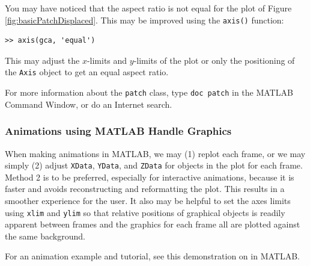 You may have noticed that the aspect ratio is not equal for the plot of Figure \ref{fig:basicPatchDisplaced}. This may be improved using the \texttt{axis()} function:
\begin{lstlisting}[style=Matlab-editor,label=basicPatchDisplace,caption={A Command Window modification to the \texttt{patch} defined in Listing \ref{basicPatch}. Line 1 is used to specify the $x$- and $y$-components of the displacement. The displacement is then applied to the original \texttt{XData} and \texttt{YData} properties, and the result of the addition is the value component of a property-value pair in the \texttt{set()} function.}]
>> axis(gca, 'equal')
\end{lstlisting}
This may adjust the \(x\)-limits and \(y\)-limits of the plot or only the positioning of the \texttt{Axis} object to get an equal aspect ratio.


For more information about the \texttt{patch} class, type \texttt{doc patch} in the MATLAB Command Window, or do an Internet search.


\subsubsection{Animations using MATLAB Handle Graphics}

When making animations in MATLAB, we may (1) replot each frame, or we may simply (2) adjust \texttt{XData}, \texttt{YData}, and \texttt{ZData} for objects in the plot for each frame. Method 2 is to be preferred, especially for interactive animations, because it is faster and avoids reconstructing and reformatting the plot. This results in a smoother experience for the user. It also may be helpful to set the axes limits using \texttt{xlim} and \texttt{ylim} so that relative positions of graphical objects is readily apparent between frames and the graphics for each frame all are plotted against the same background.

For an animation example and tutorial, see this demonstration on  in MATLAB.

